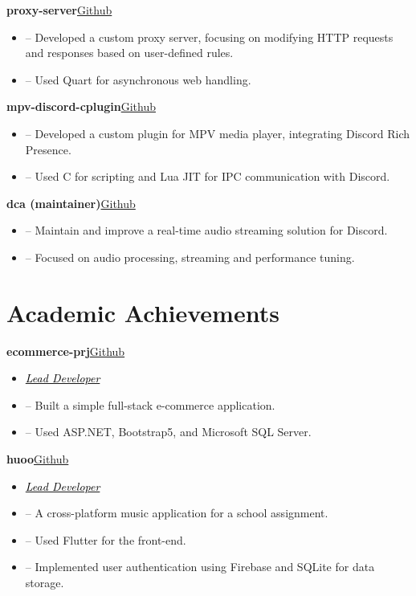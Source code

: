 \documentclass[a4paper,12pt]{article}
\newenvironment{itemList}[3][]
    {
    \noindent\hspace{1em}\textbf{#2}\hfill#3\\[3.75pt]
    \begin{minipage}[t]{\linewidth}
    \begin{itemize}[nosep,after=\strut, leftmargin=2em, itemsep=3pt,label={},#1]
    }
    {
    \end{itemize}
    \end{minipage}
    }
\newcommand{\listSubHeading}[1]{
    \item[] \noindent\hspace{-1em}\textit{#1}
    }
\begin{document}
\begin{itemList}{proxy-server}{\href{https://github.com/foxeiz/proxy-server/}{Github}}
    \item -- Developed a custom proxy server, focusing on modifying HTTP requests and responses based on user-defined rules.
    \item -- Used Quart for asynchronous web handling.
\end{itemList}

\begin{itemList}{mpv-discord-cplugin}{\href{https://github.com/foxeiz/mpv-discord-cplugin/}{Github}}
    \item -- Developed a custom plugin for MPV media player, integrating Discord Rich Presence.
    \item -- Used C for scripting and Lua JIT for IPC communication with Discord.
\end{itemList}

\begin{itemList}{dca (maintainer)}{\href{https://github.com/foxeiz/dca/}{Github}}
    \item -- Maintain and improve a real-time audio streaming solution for Discord.
    \item -- Focused on audio processing, streaming and performance tuning.
\end{itemList}

\newpage
\section{Academic Achievements}

\begin{itemList}{ecommerce-prj}{\href{https://github.com/FoxeiZ/ecommerce-prj/}{Github}}
    \listSubHeading{\href{https://github.com/FoxeiZ/ecommerce-prj/graphs/contributors}{\textcolor{black}{Lead Developer}}}
    \item -- Built a simple full-stack e-commerce application.
    \item -- Used ASP.NET, Bootstrap5, and Microsoft SQL Server.
\end{itemList}

\begin{itemList}{huoo}{\href{https://github.com/foxeiz/huoo/}{Github}}
    \listSubHeading{\href{https://github.com/FoxeiZ/huoo/graphs/contributors}{\textcolor{black}{Lead Developer}}}
    \item -- A cross-platform music application for a school assignment.
    \item -- Used Flutter for the front-end.
    \item -- Implemented user authentication using Firebase and SQLite for data storage.
\end{itemList}
\end{document}

